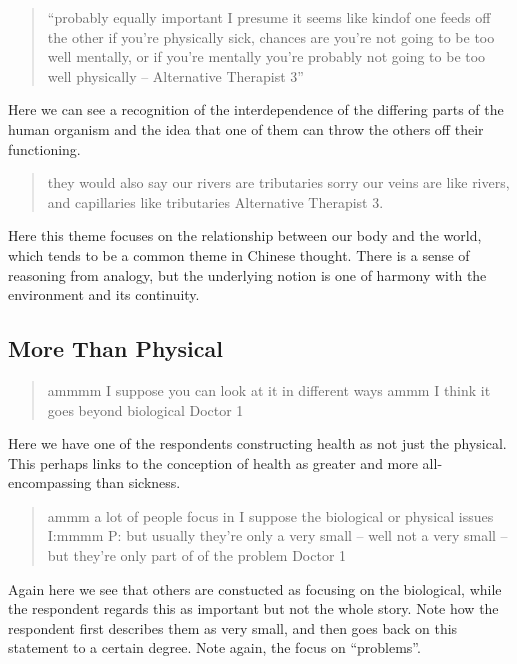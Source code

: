 \begin{quotation}
``probably equally important I presume it seems like kindof one feeds off the other if you're physically sick, chances are you're not going to be too well mentally, or if you're mentally you're probably not going to be too well physically – Alternative Therapist 3''  
\end{quotation}


Here we can see a recognition of the interdependence of the differing parts of the human organism and the idea that one of them can throw the others off their functioning. 



\begin{quotation}
  they would also say our rivers are tributaries sorry our veins are like rivers, and capillaries like tributaries 
Alternative Therapist 3. 
\end{quotation}

Here this theme focuses on the relationship between our body and the world, which tends to be a common theme in Chinese thought. There is a sense of reasoning from analogy, but the underlying notion is one of harmony with the environment and its continuity. 


\subsection{More Than Physical}
\label{sec:more-than-physical}

\begin{quotation}
  ammmm I suppose you can look at it in different ways ammm I think it goes beyond biological 
Doctor 1
\end{quotation}

Here we have one of the respondents constructing health as not just the physical. This perhaps links to the conception of health as greater and more all-encompassing than sickness. 

\begin{quotation}
  ammm a lot of people focus in I suppose the biological or physical issues
I:mmmm
P: but usually they're only a very small – well not a very small – but they're only part of of the problem
Doctor 1
\end{quotation}

Again here we see that others are constucted as focusing on the biological, while the respondent regards this as important but not the whole story. Note how the respondent first describes them as very small, and then goes back on this statement to a certain degree. Note again, the focus on ``problems''. 


